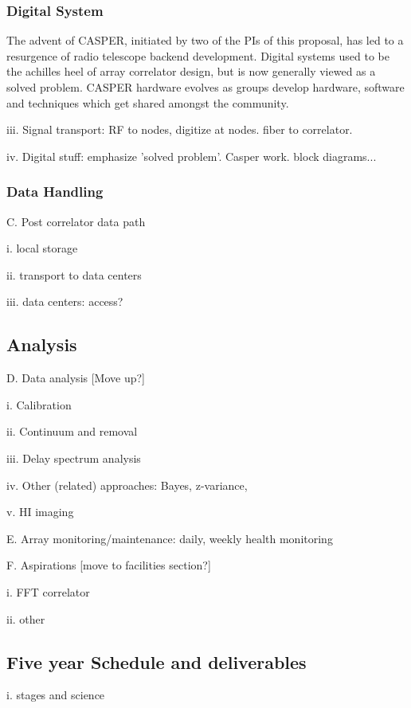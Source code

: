 \documentclass[preprint]{aastex}
\begin{document}
\subsubsection{Digital System}
The advent of CASPER, initiated by two of the PIs of this proposal, has led to a resurgence of radio telescope 
backend development.  Digital systems used to be the achilles heel of array correlator design, but is now
generally viewed as a solved problem.  CASPER hardware evolves as groups develop hardware, software and
techniques which get shared amongst the community.

iii. Signal transport: RF to nodes, digitize at nodes. fiber to correlator. 

iv. Digital stuff: emphasize 'solved problem'. Casper work. block diagrams...

\subsubsection{Data Handling}
C. Post correlator data path

i. local storage

ii. transport to data centers

iii. data centers: access? 

\subsection{Analysis}
D. Data analysis [Move up?]

i. Calibration 

ii. Continuum and removal

iii. Delay spectrum analysis

iv. Other (related) approaches: Bayes, z-variance,

v. HI imaging

E. Array monitoring/maintenance: daily, weekly health monitoring

F. Aspirations [move to facilities section?]

i. FFT correlator

ii. other

\subsection{Five year Schedule and deliverables} %

i. stages and science
\end{document}
